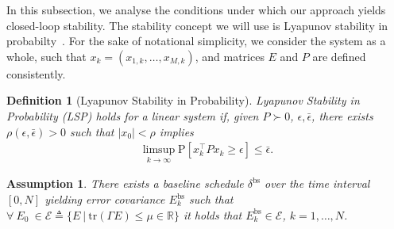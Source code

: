 \documentclass[letterpaper, 10 pt, conference]{ieeeconf}  %
\newtheorem{Proposition}[Theorem]{Propositon}
\newtheorem{Assumption}[Theorem]{Assumption}
\newtheorem{Definition}[Theorem]{Definition}
\begin{document}
In this subsection, we analyse the conditions under which our approach yields closed-loop stability. The stability concept we will use is Lyapunov stability in probabilty~\cite{Kozin1969}. For the sake of notational simplicity, 
we consider the system as a whole, such that $x_k=(x_{1,k},\ldots,x_{M,k})$, and matrices $E$ and $P$ are defined consistently.
\begin{Definition}[Lyapunov Stability in Probability]
	Lyapunov Stability in Probability (LSP) holds for a linear system %
	if, given $P\succ0$, $\epsilon, \bar \epsilon$, there exists $\rho(\epsilon,\bar \epsilon)>0$ such that $|x_0|<\rho$ implies
	\begin{align*}
		\limsup_{k\rightarrow\infty} \mathrm{P}[x_k^\top P x_k \geq \epsilon ]\leq \bar \epsilon.
	\end{align*}
\end{Definition}


\begin{Assumption}
	\label{ass:schedule}
	There exists a baseline schedule $\delta^\mathrm{bs}$ over the time interval $[0,N]$ yielding error covariance $E_k^\mathrm{bs}$ such that
	 $\forall \ E_0 \ \in \mathcal{E} \triangleq \{ E \ | \ \mathrm{tr}(\Gamma E) \leq \mu \in \mathbb{R} \}$ it holds that $E_k^\mathrm{bs}\in\mathcal{E}$, $k=1,\ldots,N$. %
\end{Assumption}
\end{document}
